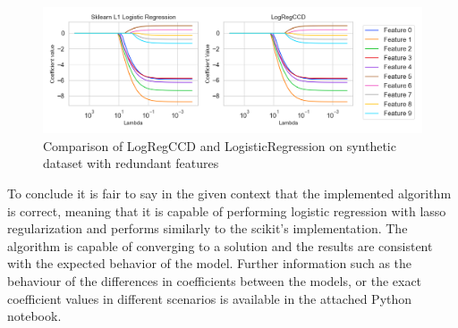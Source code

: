 \documentclass[12pt]{article}
\begin{document}
\begin{figure}[h]
    \centering
  \includegraphics[width=\textwidth]{../results/logistic_regression_l1_logregccd_coefficients_redundant_features.png}
    \caption{Comparison of LogRegCCD and LogisticRegression on synthetic dataset with redundant features}
    \label{fig:comparison-synthetic-dataset-redundant-features}
  \end{figure}


To conclude it is fair to say in the given context that the implemented algorithm is correct, meaning that it is capable of performing logistic regression with lasso regularization and performs similarly to the scikit's implementation. The algorithm is capable of converging to a solution and the results are consistent with the expected behavior of the model. Further information such as the behaviour of the differences in coefficients between the models, or the exact coefficient values in different scenarios is available in the attached Python notebook.


\clearpage 
\listoffigures
\printbibliography
\end{document}
